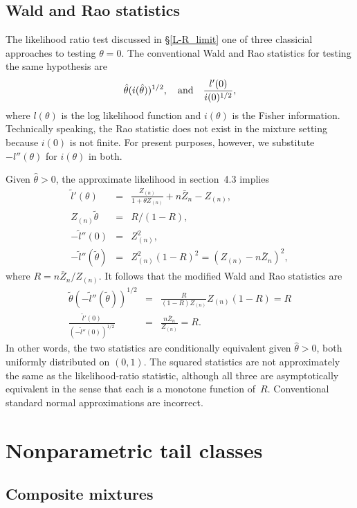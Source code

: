 \documentclass[11pt]{article}
\theoremstyle{definition}
\begin{document}
\subsection{Wald and Rao statistics}

The likelihood ratio test discussed in \S \ref{L-R_limit} one of three classicial approaches to testing $\theta=0$. The conventional Wald and Rao statistics for testing the same hypothesis are
\[
\hat\theta (i(\hat\theta))^{1/2}, \quad \hbox{and}\quad \frac{l'(0)} {i(0)^{1/2}},
\]
where $l(\theta)$ is the log likelihood function and $i(\theta)$ is the Fisher information. Technically speaking, the Rao statistic does not exist in the mixture setting because $i(0)$ is not finite.
For present purposes, however, we substitute $-l''(\theta)$ for $i(\theta)$ in both.

Given $\hat\theta > 0$, the approximate likelihood in section~4.3 implies
\begin{eqnarray*}
	{\tilde l}'(\theta) &=& \frac{Z_{(n)}} {1 + \theta Z_{(n)}} + n\bar Z_n - Z_{(n)}, \\
	Z_{(n)}\tilde\theta &=& R/(1-R), \\
	-{\tilde l}''(0) &=& Z_{(n)}^2, \\
	-{\tilde l}''(\tilde\theta) &=& Z_{(n)}^2(1 - R)^2 = (Z_{(n)} - n \bar Z_n)^2 ,
\end{eqnarray*}
where $R = n\bar Z_n/Z_{(n)}$.
It follows that the modified Wald and Rao statistics are
\begin{eqnarray*}
	\tilde\theta (-{\tilde l}''(\tilde\theta))^{1/2} &=& \frac R {(1-R) Z_{(n)}} Z_{(n)} (1-R) = R \\
	\frac{{\tilde l}'(0)} {(-{\tilde l}''(0))^{1/2}} &=& \frac {n \bar Z_n} {Z_{(n)}} = R.
\end{eqnarray*}
In other words, the two statistics are conditionally equivalent given $\hat\theta > 0$, both uniformly distributed on $(0, 1)$.
The squared statistics are not approximately the same as the likelihood-ratio statistic,
although all three are asymptotically equivalent in the sense that each is a monotone function of~$R$.  Conventional standard normal approximations are incorrect. 




\section{Nonparametric tail classes}\label{secComposite}

\subsection{Composite mixtures}
\end{document}
